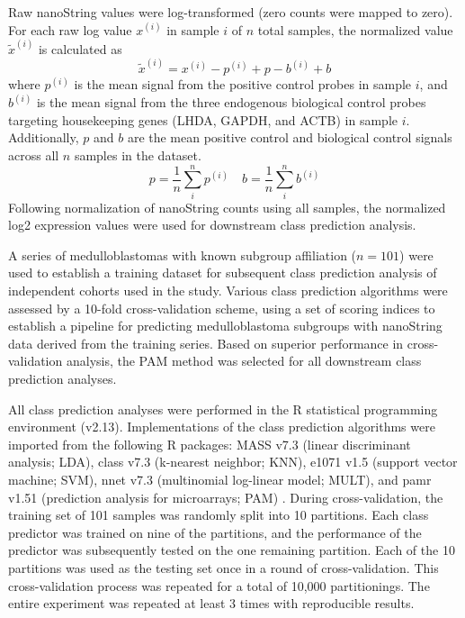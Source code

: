 Raw nanoString values were log-transformed (zero counts were mapped to zero). For each raw log value $x^{(i)}$ in sample $i$ of $n$ total samples, the normalized value $\tilde{x}^{(i)}$ is calculated as
\[
\tilde{x}^{(i)} = x^{(i)} - p^{(i)} + p - b^{(i)} + b
\]
where $p^{(i)}$ is the mean signal from the positive control probes in sample $i$, and $b^{(i)}$ is the mean signal from the three endogenous biological control probes targeting housekeeping genes (LHDA, GAPDH, and ACTB) in sample $i$. Additionally, $p$ and $b$ are the mean positive control and biological control signals across all $n$ samples in the dataset.
\[
p = \frac{1}{n} \sum_i^n p^{(i)} \,\,\,\,\,\,
b = \frac{1}{n} \sum_i^n b^{(i)}
\]
Following normalization of nanoString counts using all samples, the normalized log2 expression values were used for downstream class prediction analysis.

A series of medulloblastomas with known subgroup affiliation ($n = 101$) were used to establish a training dataset for subsequent class prediction analysis of independent cohorts used in the study. Various class prediction algorithms were assessed by a 10-fold cross-validation scheme, using a set of scoring indices to establish a pipeline for predicting medulloblastoma subgroups with nanoString data derived from the training series. Based on superior performance in cross-validation analysis, the PAM method was selected for all downstream class prediction analyses.

All class prediction analyses were performed in the R statistical programming environment (v2.13). Implementations of the class prediction algorithms were imported from the following R packages: MASS v7.3 (linear discriminant analysis; LDA), class v7.3 (k-nearest neighbor; KNN), e1071 v1.5 (support vector machine; SVM), nnet v7.3 (multinomial log-linear model; MULT), and pamr v1.51 (prediction analysis for microarrays; PAM) . During cross-validation, the training set of 101 samples was randomly split into 10 partitions. Each class predictor was trained on nine of the partitions, and the performance of the predictor was subsequently tested on the one remaining partition. Each of the 10 partitions was used as the testing set once in a round of cross-validation. This cross-validation process was repeated for a total of 10,000 partitionings. The entire experiment was repeated at least 3 times with reproducible results.

